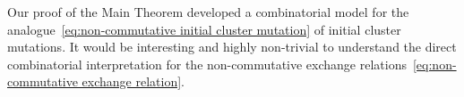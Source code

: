 
\begin{remark}
 Our proof of the Main Theorem developed a combinatorial model for the analogue~\eqref{eq:non-commutative initial cluster mutation} of initial cluster mutations.
 It would be interesting and highly non-trivial to understand the direct combinatorial interpretation for the non-commutative exchange relations~\eqref{eq:non-commutative exchange relation}.
\end{remark}


